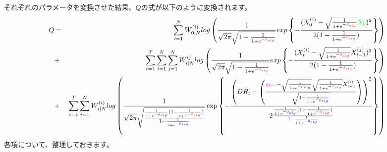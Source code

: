 \documentclass[a4j,11pt]{jarticle}
\begin{document}
それぞれのパラメータを変換させた結果、$Q$の式が以下のように変換されます。
\begin{eqnarray*}
Q&=&\sum_{i=1}^NW_{0|N}^{(i)}log\left(\frac{1}{\sqrt{2\pi}\sqrt{1 - \frac{1}{1+e^{-\textcolor{red}{\beta_{sig}}}}}}exp\left\{-\frac{(X_{0}^{(i)}-\sqrt{\frac{1}{1+e^{-\textcolor{red}{\beta_{sig}}}}}\textcolor{green}{X_0})^2}
{2(1 - \frac{1}{1+e^{-\textcolor{red}{\beta_{sig}}}})} \right\}\right)\\
&+&\sum_{t=1}^{T}\sum_{i=1}^{N}\sum_{j=1}^{N}W_{i|N}^{ij}log \left(\frac{1}{\sqrt{2\pi}\sqrt{1 - \frac{1}{1+e^{-\textcolor{red}{\beta_{sig}}}}}}exp\left\{-\frac{(X_{t}^{(i)}-\sqrt{\frac{1}{1+e^{-\textcolor{red}{\beta_{sig}}}}}X_{t-1}^{(j)})^2}
{2(1 - \frac{1}{1+e^{-\textcolor{red}{\beta_{sig}}}})} \right\}\right)\\
&+&\sum_{t=1}^{T}\sum_{i=1}^{N}W_{i|N}^{(i)}log\left(\frac{1}{\sqrt{2\pi}\sqrt{ \frac{\frac{1}{1+e^{-\textcolor{blue}{\rho_{sig}}}} (1 - \frac{1}{1+e^{-\textcolor{red}{\beta_{sig}}}})}{1 -  \frac{1}{1+e^{-\textcolor{blue}{\rho_{sig}}}}}}}
\exp\left\{-\frac{\left(DR_t-\left(\frac{\textcolor{magenta}{q_{Inv}}-\sqrt{ \frac{1}{1+e^{-\textcolor{blue}{\rho_{sig}}}}}\sqrt{\frac{1}{1+e^{-\textcolor{red}{\beta_{sig}}}}}X_{t-1}^{(i)}}{\sqrt{1- \frac{1}{1+e^{-\textcolor{blue}{\rho_{sig}}}}}}\right)\right)^2}{2 \frac{ \frac{1}{1+e^{-\textcolor{blue}{\rho_{sig}}}}(1 - \frac{1}{1+e^{-\textcolor{red}{\beta_{sig}}}})}{1 -  \frac{1}{1+e^{-\textcolor{blue}{\rho_{sig}}}}}}\right\}\right)
\end{eqnarray*}
各項について、整理しておきます。
\end{document}
